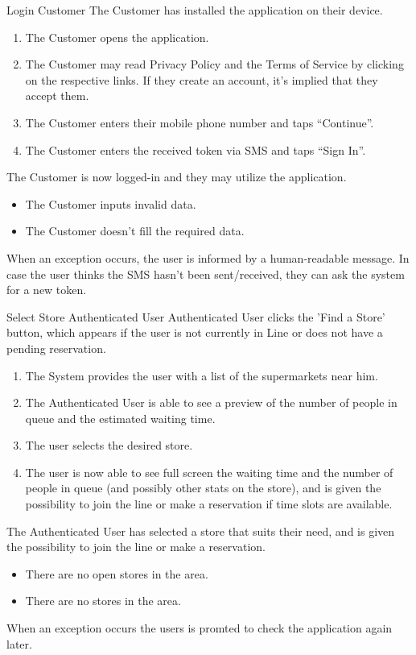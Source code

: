 \usecase
{Login}
{Customer}
{The Customer has installed the application on their device.}
{
    \begin{enumerate}
        \item The Customer opens the application.
        \item The Customer may read Privacy Policy and the Terms of Service by clicking on the respective links. If they create an account, it's implied that they accept them.
        \item The Customer enters their mobile phone number and taps ``Continue''.
        \item The Customer enters the received token via SMS and taps ``Sign In''.
    \end{enumerate}
}
{The Customer is now logged-in and they may utilize the application.}
{
    \begin{itemize}
        \item The Customer inputs invalid data.
        \item The Customer doesn't fill the required data.
    \end{itemize}
}
{
    When an exception occurs, the user is informed by a human-readable message.
    In case the user thinks the SMS hasn't been sent/received, they can ask the system for a new token.
}

\usecase
{Select Store}
{Authenticated User}
{Authenticated User clicks the 'Find a Store' button, which appears if the user is not currently in Line or does not have a pending reservation.}
{
        \begin{enumerate}
            \item The System provides the user with a list of the supermarkets near him.
            \item The Authenticated User is able to see a preview of the number of people in queue and the estimated waiting time. 
            \item The user selects the desired store. 
            \item The user is now able to see full screen the waiting time and the number of people in queue (and possibly other stats on the store), and is given the possibility to join the line or make a reservation if time slots are available.  
        \end{enumerate}
}
{
    The Authenticated User has selected a store that suits their need, and is given the possibility to join the line or make a reservation. 
}
{
    \begin{itemize}
        \item There are no open stores in the area. 
        \item There are no stores in the area. 
    \end{itemize}
}
{
    When an exception occurs the users is promted to check the application again later. 
}

